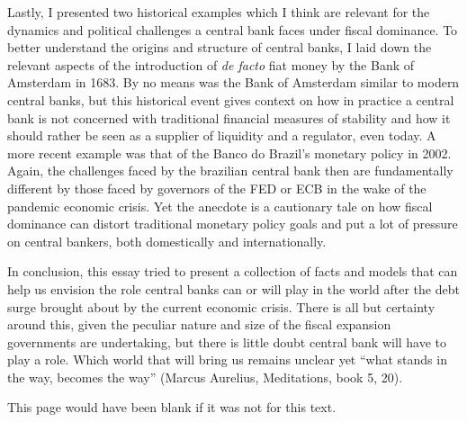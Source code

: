 \documentclass[american]{scrartcl}
\begin{document}
Lastly, I presented two historical examples which I think are relevant for the dynamics and political challenges a central bank faces under fiscal dominance. To better understand the origins and structure of central banks, I laid down the relevant aspects of the introduction of \textit{de facto} fiat money by the Bank of Amsterdam in 1683. By no means was the Bank of Amsterdam similar to modern central banks, but this historical event gives context on how in practice a central bank is not concerned with traditional financial measures of stability and how it should rather be seen as a supplier of liquidity and a regulator, even today. A more recent example was that of the Banco do Brazil's monetary policy in 2002. Again, the challenges faced by the brazilian central bank then are fundamentally different by those faced by governors of the FED or ECB in the wake of the pandemic economic crisis. Yet the anecdote is a cautionary tale on how fiscal dominance can distort traditional monetary policy goals and put a lot of pressure on central bankers, both domestically and internationally.

In conclusion, this essay tried to present a collection of facts and models that can help us envision the role central banks can or will play in the world after the debt surge brought about by the current economic crisis. There is all but certainty around this, given the peculiar nature and size of the fiscal expansion governments are undertaking, but there is little doubt central bank will have to play a role. Which world that will bring us remains unclear yet ``what stands in the way, becomes the way'' (Marcus Aurelius, Meditations, book 5, 20).

\newpage
\printbibliography

\newpage
This page would have been blank if it was not for this text.
\end{document}
